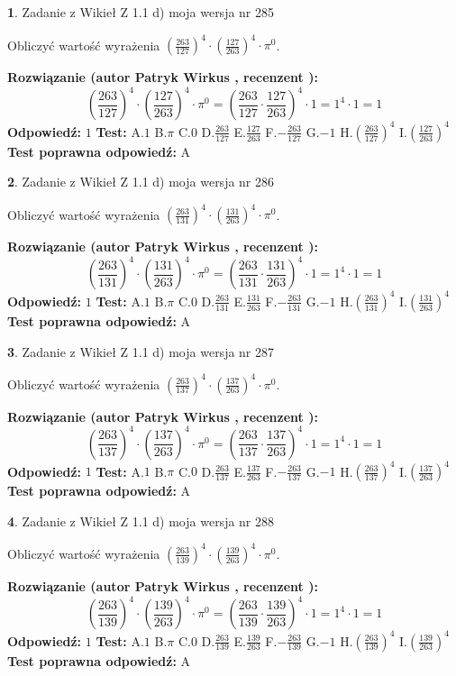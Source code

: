 \documentclass[12pt, a4paper]{article}
\theoremstyle{definition} %
\newtheorem{zad}{}
\newcommand{\zadStart}[1]{\begin{zad}#1\newline}
\newcommand{\zadStop}{\end{zad}}
\newcommand{\rozwStart}[2]{\noindent \textbf{Rozwiązanie (autor #1 , recenzent #2): }\newline}
\newcommand{\rozwStop}{\newline}
\newcommand{\odpStart}{\noindent \textbf{Odpowiedź:}\newline}
\newcommand{\odpStop}{\newline}
\newcommand{\testStart}{\noindent \textbf{Test:}\newline}
\newcommand{\testStop}{\newline}
\newcommand{\kluczStart}{\noindent \textbf{Test poprawna odpowiedź:}\newline}
\newcommand{\kluczStop}{\newline}
\begin{document}
\zadStart{Zadanie z Wikieł Z 1.1 d) moja wersja nr 285}

Obliczyć wartość wyrażenia $(\frac{263}{127})^{4} \cdot (\frac{127}{263})^{4} \cdot \pi^{0}$.
\zadStop
\rozwStart{Patryk Wirkus}{}
$$(\frac{263}{127})^{4} \cdot (\frac{127}{263})^{4} \cdot \pi^{0} = (\frac{263}{127} \cdot \frac{127}{263})^{4} \cdot 1 = 1^{4} \cdot 1 = 1$$
\rozwStop
\odpStart
$1$
\odpStop
\testStart
A.$1$ B.$\pi$ C.$0$ D.$\frac{263}{127}$ E.$\frac{127}{263}$
F.$-\frac{263}{127}$ G.$-1$
H.$(\frac{263}{127})^{4}$
I.$(\frac{127}{263})^{4}$
\testStop
\kluczStart
A
\kluczStop



\zadStart{Zadanie z Wikieł Z 1.1 d) moja wersja nr 286}

Obliczyć wartość wyrażenia $(\frac{263}{131})^{4} \cdot (\frac{131}{263})^{4} \cdot \pi^{0}$.
\zadStop
\rozwStart{Patryk Wirkus}{}
$$(\frac{263}{131})^{4} \cdot (\frac{131}{263})^{4} \cdot \pi^{0} = (\frac{263}{131} \cdot \frac{131}{263})^{4} \cdot 1 = 1^{4} \cdot 1 = 1$$
\rozwStop
\odpStart
$1$
\odpStop
\testStart
A.$1$ B.$\pi$ C.$0$ D.$\frac{263}{131}$ E.$\frac{131}{263}$
F.$-\frac{263}{131}$ G.$-1$
H.$(\frac{263}{131})^{4}$
I.$(\frac{131}{263})^{4}$
\testStop
\kluczStart
A
\kluczStop



\zadStart{Zadanie z Wikieł Z 1.1 d) moja wersja nr 287}

Obliczyć wartość wyrażenia $(\frac{263}{137})^{4} \cdot (\frac{137}{263})^{4} \cdot \pi^{0}$.
\zadStop
\rozwStart{Patryk Wirkus}{}
$$(\frac{263}{137})^{4} \cdot (\frac{137}{263})^{4} \cdot \pi^{0} = (\frac{263}{137} \cdot \frac{137}{263})^{4} \cdot 1 = 1^{4} \cdot 1 = 1$$
\rozwStop
\odpStart
$1$
\odpStop
\testStart
A.$1$ B.$\pi$ C.$0$ D.$\frac{263}{137}$ E.$\frac{137}{263}$
F.$-\frac{263}{137}$ G.$-1$
H.$(\frac{263}{137})^{4}$
I.$(\frac{137}{263})^{4}$
\testStop
\kluczStart
A
\kluczStop



\zadStart{Zadanie z Wikieł Z 1.1 d) moja wersja nr 288}

Obliczyć wartość wyrażenia $(\frac{263}{139})^{4} \cdot (\frac{139}{263})^{4} \cdot \pi^{0}$.
\zadStop
\rozwStart{Patryk Wirkus}{}
$$(\frac{263}{139})^{4} \cdot (\frac{139}{263})^{4} \cdot \pi^{0} = (\frac{263}{139} \cdot \frac{139}{263})^{4} \cdot 1 = 1^{4} \cdot 1 = 1$$
\rozwStop
\odpStart
$1$
\odpStop
\testStart
A.$1$ B.$\pi$ C.$0$ D.$\frac{263}{139}$ E.$\frac{139}{263}$
F.$-\frac{263}{139}$ G.$-1$
H.$(\frac{263}{139})^{4}$
I.$(\frac{139}{263})^{4}$
\testStop
\kluczStart
A
\kluczStop
\end{document}
